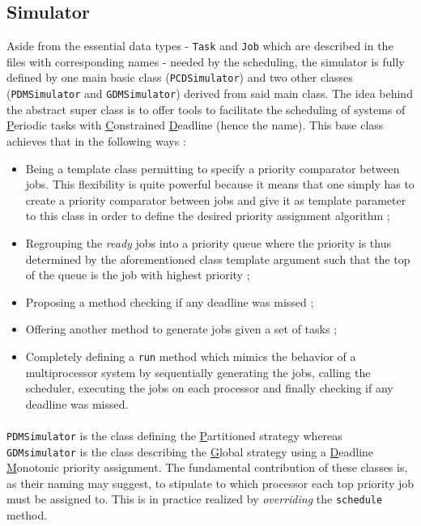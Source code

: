 \documentclass[a4paper]{article}
\begin{document}
\subsection{Simulator}
Aside from the essential data types - \texttt{Task} and \texttt{Job} which are described in the files with corresponding names - needed by the scheduling, the simulator is fully defined by one main basic class (\texttt{PCDSimulator}) and two other classes (\texttt{PDMSimulator} and \texttt{GDMSimulator}) derived from said main class. The idea behind the abstract super class is to offer tools to facilitate the scheduling of systems of \underline{P}eriodic tasks with \underline{C}onstrained \underline{D}eadline (hence the name).
This base class achieves that in the following ways : 
\begin{itemize}
	\item Being a template class permitting to specify a priority comparator between jobs. This flexibility is quite powerful because it means that one simply has to create a priority comparator between jobs and give it as template parameter to this class in order to define the desired priority assignment algorithm ;
	\item Regrouping the \textit{ready} jobs into a priority queue where the priority is thus determined by the aforementioned class template argument such that the top of the queue is the job with highest priority ;
	\item Proposing a method checking if any deadline was missed ;
	\item Offering another method to generate jobs given a set of tasks ;
	\item Completely defining a \texttt{run} method which mimics the behavior of a multiprocessor system by sequentially generating the jobs, calling the scheduler, executing the jobs on each processor and finally checking if any deadline was missed.	
\end{itemize}
\paragraph{}
\texttt{PDMSimulator} is the class defining the \underline{P}artitioned strategy whereas \texttt{GDMsimulator} is the class describing the \underline{G}lobal strategy using a \underline{D}eadline \underline{M}onotonic priority assignment. The fundamental contribution of these classes is, as their naming may suggest, to stipulate to which processor each top priority job must be assigned to. This is in practice realized by \textit{overriding} the \texttt{schedule} method. 
\end{document}
